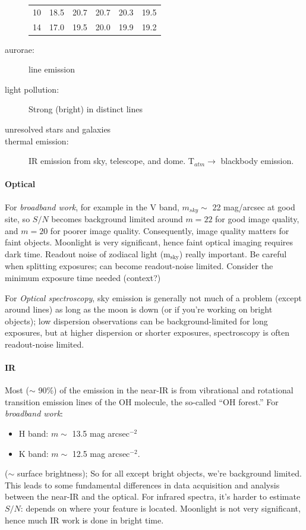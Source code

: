 \documentclass[12pt]{article}
\newcommand{\mynotes}[1]{\textcolor{myBlue}{#1}}
\begin{document}
\begin{description}
\begin{center}
\begin{tabular}{c c c c c c}
                10 & 18.5 & 20.7 & 20.7 & 20.3 & 19.5\\
                14 & 17.0 & 19.5 & 20.0 & 19.9 & 19.2\\
            \end{tabular}
        \end{center}
    \item [aurorae:] line emission
    \item [light pollution:] Strong (bright) in distinct lines
    \item [unresolved stars and galaxies]
    \item [thermal emission:] IR emission from sky,
        telescope, and dome.
        T$_{atm} \rightarrow$ blackbody emission.
\end{description}

\paragraph{Optical}
For \textit{broadband work}, for example in the V band, $m_{sky}\sim$ 22
mag/arcsec at good site, so $S/N$ becomes background limited around $m=22$ for
good image quality, and $m=20$ for poorer image quality. Consequently, image
quality matters for faint objects. Moonlight is very significant, hence faint
optical imaging requires dark time. \mynotes {Readout noise of zodiacal light
(m$_{\mathrm{sky}}$) really important. Be careful when splitting exposures; can
become readout-noise limited. Consider the minimum exposure time needed
(context?)}

For \textit{Optical spectroscopy}, sky emission is generally not much of a
problem (except around lines) as long as the moon is down (or if you're working on
bright objects); low dispersion observations can be background-limited for long
exposures, but at higher dispersion or shorter exposures, spectroscopy is often
readout-noise limited.

\paragraph{IR}
Most ($\sim$ 90\%) of the emission in the near-IR is from vibrational and
rotational transition emission lines of the OH molecule, the so-called ``OH
forest.'' For \textit{broadband work}:
\begin{itemize}
    \item H band: $m\sim$ 13.5 mag arcsec$^{-2}$
    \item K band: $m\sim$ 12.5 mag arcsec$^{-2}$.
\end{itemize}
($\sim$ surface brightness);
So for all except bright objects, we're background limited. This leads to some
fundamental differences in data acquisition and analysis between the near-IR
and the optical. For infrared spectra, it's harder to estimate $S/N$: depends
on where your feature is located. Moonlight is not very significant, hence much
IR work is done in bright time.
\end{document}
